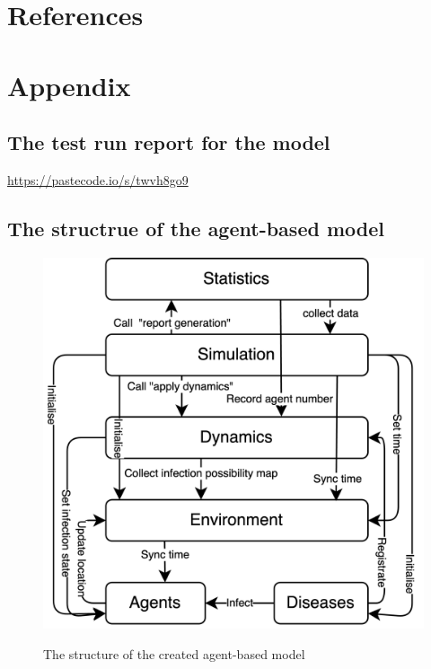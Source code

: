 \documentclass[12pt]{article}
\begin{document}
\section{References}
\printbibliography[heading=none]

\newpage

\section{Appendix}
\begin{appendices}
    \subsection{The test run report for the model}
    \url{https://pastecode.io/s/twvh8go9}

    \subsection{The structrue of the agent-based model}
    \begin{figure}[ht]
		\centering
		\includegraphics[width=0.6\linewidth]{./assets/model-structure.png}
        \label{fig:model-structure}
		\caption{\scriptsize \sffamily The structure of the created agent-based model} 
	\end{figure}

    \newpage


\end{appendices}
\end{document}
